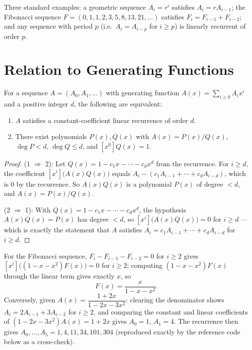 \documentclass[11pt]{article}
\begin{document}
\begin{examplebox}
Three standard examples: a geometric sequence $A_i=r^i$ satisfies
$A_i=rA_{i-1}$; the Fibonacci sequence
$F=(0,1,1,2,3,5,8,13,21,\ldots)$ satisfies $F_i=F_{i-1}+F_{i-2}$; and any
sequence with period $p$ (i.e.\ $A_i=A_{i-p}$ for $i \ge p$) is linearly
recurrent of order $p$.
\end{examplebox}

\section{Relation to Generating Functions}
\begin{theorembox}
For a sequence $A=(A_0,A_1,\ldots)$ with generating function
$A(x)=\sum_{i\ge 0}A_ix^i$ and a positive integer $d$, the following are
equivalent:
\begin{enumerate}[leftmargin=1.7em]
  \item $A$ satisfies a constant-coefficient linear recurrence of order
        $d$.
  \item There exist polynomials $P(x),Q(x)$ with $A(x)=P(x)/Q(x)$,
        $\deg P < d$, $\deg Q \le d$, and $[x^0]Q(x)=1$.
\end{enumerate}
\end{theorembox}
\begin{proof}
(1 $\Rightarrow$ 2): Let $Q(x) = 1 - c_1x - \cdots - c_dx^d$ from the
recurrence. For $i \ge d$, the coefficient $[x^i]\bigl(A(x)Q(x)\bigr)$
equals $A_i - (c_1A_{i-1}+\cdots+c_dA_{i-d})$, which is $0$ by the
recurrence. So $A(x)Q(x)$ is a polynomial $P(x)$ of degree $<d$, and
$A(x)=P(x)/Q(x)$.

(2 $\Rightarrow$ 1): With $Q(x)=1-c_1x-\cdots-c_dx^d$, the hypothesis
$A(x)Q(x)=P(x)$ has degree $<d$, so $[x^i]\bigl(A(x)Q(x)\bigr)=0$ for
$i \ge d$ --- which is exactly the statement that $A$ satisfies
$A_i=c_1A_{i-1}+\cdots+c_dA_{i-d}$ for $i \ge d$.
\end{proof}

\begin{examplebox}
For the Fibonacci sequence, $F_i - F_{i-1} - F_{i-2} = 0$ for $i \ge 2$
gives $[x^i]\bigl((1-x-x^2)F(x)\bigr) = 0$ for $i \ge 2$; computing
$(1-x-x^2)F(x)$ through the linear term gives exactly $x$, so
\[
  F(x) = \frac{x}{1-x-x^2}.
\]
Conversely, given $A(x) = \dfrac{1+2x}{1-2x-3x^2}$: clearing the
denominator shows $A_i = 2A_{i-1}+3A_{i-2}$ for $i\ge 2$, and comparing
the constant and linear coefficients of $(1-2x-3x^2)A(x)=1+2x$ gives
$A_0=1$, $A_1=4$. The recurrence then gives
$A_0,\ldots,A_5 = 1,4,11,34,101,304$ (reproduced exactly by the
reference code below as a cross-check).
\end{examplebox}
\end{document}
